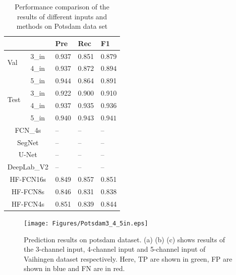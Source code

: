\begin{table}[htbp]
\caption {Performance comparison of the results of different inputs and methods on Potsdam data set} 
\label{table:Potsdam-3-4-5in-comp}
\centering
\begin{tabular}{p{0.5cm}<{\centering}|p{1.1cm}<{\centering}|p{1.1cm}<{\centering}|p{1.1cm}<{\centering}|p{1.1cm}<{\centering}}
\hline
&&Pre&Rec&F1\\
\hline
\multirow{2}{*}{Val}&3\_in&0.937&0.851&0.879\\
&4\_in&0.937&$\bm{0.872}$&$\bm{0.894}$\\
&5\_in&$\bm{0.944}$&0.864&0.891\\
\hline
\multirow{2}{*}{Test}&3\_in&0.922&0.900&0.910\\
&4\_in&0.937&0.935&0.936\\
&5\_in&$\bm{0.940}$&$\bm{0.943}$&$\bm{0.941}$\\
\hline\hline
\multicolumn{2}{c|}{FCN\_4s\cite{IEEEexample:Long_2015_CVPR}}&{--}&{--}&{--}\\
\multicolumn{2}{c|}{SegNet\cite{IEEEexample:badrinarayanan2017segnet}}&{--}&{--}&{--}\\
\multicolumn{2}{c|}{U-Net\cite{IEEEexample:ronneberger2015u}}&{--}&{--}&{--}\\
\multicolumn{2}{c|}{DeepLab\_V2\cite{IEEEexample:chen2016deeplab}}&{--}&{--}&{--}\\
\hline \hline
\multicolumn{2}{c|}{HF-FCN16s}&{0.849}&{0.857}&{0.851}\\
\multicolumn{2}{c|}{HF-FCN8s}&{0.846}&{0.831}&{0.838}\\
\multicolumn{2}{c|}{HF-FCN4s}&{0.851}&{0.839}&{0.844}\\
\hline
\end{tabular}
\end{table}
\begin{figure}
\centering
\texttt{[image: Figures/Potsdam3\_4\_5in.eps]}
\caption{Prediction results on potsdam dataset. (a) (b) (c) shows results of the 3-channel input, 4-channel input and 5-channel input of Vaihingen dataset respectively. Here, TP are shown in green, FP are shown in blue and FN are in red.}
\label{fig:Potsdam-3-4-5in-visi}
\end{figure}

